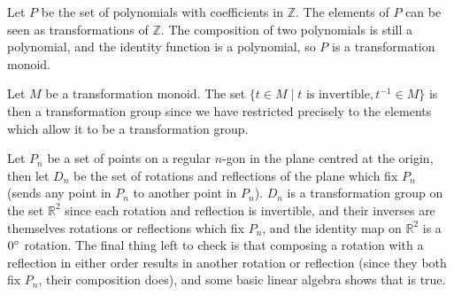 \begin{example}
    Let $P$ be the set of polynomials with coefficients in $\mathbb{Z}$. The elements of $P$ can be seen as transformations of $\mathbb{Z}$. The composition of two polynomials is still a polynomial, and the identity function is a polynomial, so $P$ is a transformation monoid.
\end{example}

\begin{example}
    Let $M$ be a transformation monoid. The set $\{t \in M \mid \text{$t$ is invertible}, t^{-1} \in M \}$ is then a transformation group since we have restricted precisely to the elements which allow it to be a transformation group.
\end{example}

\begin{example}
    Let $P_n$ be a set of points on a regular $n$-gon in the plane centred at the origin, then let $D_n$ be the set of rotations and reflections of the plane which fix $P_n$ (sends any point in $P_n$ to another point in $P_n$). $D_n$ is a transformation group on the set $\mathbb{R}^2$ since each rotation and reflection is invertible, and their inverses are themselves rotations or reflections which fix $P_n$, and the identity map on $\mathbb{R}^2$ is a $0\degree$ rotation. The final thing left to check is that composing a rotation with a reflection in either order results in another rotation or reflection (since they both fix $P_n$, their composition does), and some basic linear algebra shows that is true.
\end{example}
